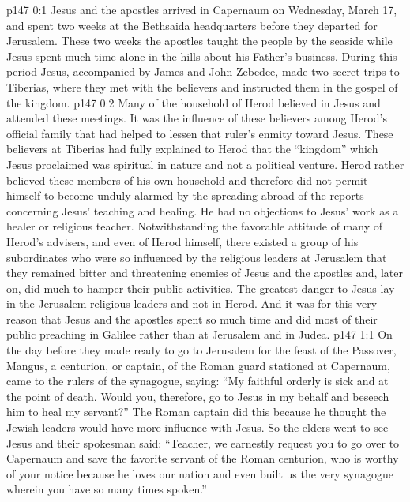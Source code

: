 \author{Midwayer Commission}
\vs p147 0:1 Jesus and the apostles arrived in Capernaum on Wednesday, March 17, and spent two weeks at the Bethsaida headquarters before they departed for Jerusalem. These two weeks the apostles taught the people by the seaside while Jesus spent much time alone in the hills about his Father’s business. During this period Jesus, accompanied by James and John Zebedee, made two secret trips to Tiberias, where they met with the believers and instructed them in the gospel of the kingdom.
\vs p147 0:2 Many of the household of Herod believed in Jesus and attended these meetings. It was the influence of these believers among Herod’s official family that had helped to lessen that ruler’s enmity toward Jesus. These believers at Tiberias had fully explained to Herod that the “kingdom” which Jesus proclaimed was spiritual in nature and not a political venture. Herod rather believed these members of his own household and therefore did not permit himself to become unduly alarmed by the spreading abroad of the reports concerning Jesus’ teaching and healing. He had no objections to Jesus’ work as a healer or religious teacher. Notwithstanding the favorable attitude of many of Herod’s advisers, and even of Herod himself, there existed a group of his subordinates who were so influenced by the religious leaders at Jerusalem that they remained bitter and threatening enemies of Jesus and the apostles and, later on, did much to hamper their public activities. The greatest danger to Jesus lay in the Jerusalem religious leaders and not in Herod. And it was for this very reason that Jesus and the apostles spent so much time and did most of their public preaching in Galilee rather than at Jerusalem and in Judea.\plusone
{}%
\vs p147 1:1 On the day before they made ready to go to Jerusalem for the feast of the Passover, Mangus, a centurion, or captain, of the Roman guard stationed at Capernaum, came to the rulers of the synagogue, saying: “My faithful orderly is sick and at the point of death. Would you, therefore, go to Jesus in my behalf and beseech him to heal my servant?” The Roman captain did this because he thought the Jewish leaders would have more influence with Jesus. So the elders went to see Jesus and their spokesman said: “Teacher, we earnestly request you to go over to Capernaum and save the favorite servant of the Roman centurion, who is worthy of your notice because he loves our nation and even built us the very synagogue wherein you have so many times spoken.”
